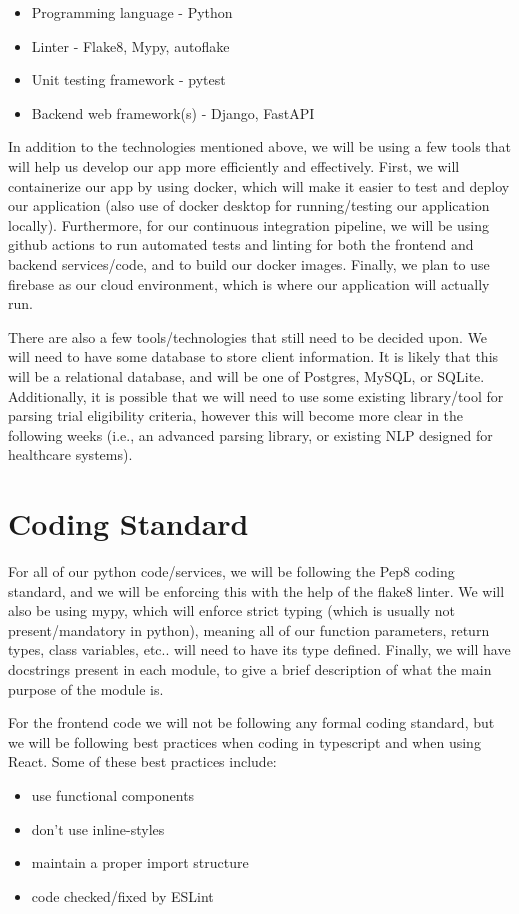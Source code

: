 \documentclass{article}
\begin{document}
\begin{itemize}
	\item Programming language - Python
	\item Linter - Flake8, Mypy, autoflake
	\item Unit testing framework - pytest
	\item Backend web framework(s) - Django, FastAPI
\end{itemize}

In addition to the technologies mentioned above, we will be using a few tools that will help us 
develop our app more efficiently and effectively. First, we will containerize our app
by using docker, which will make it easier to test and deploy our application (also use of docker desktop for running/testing
our application locally). Furthermore, for our continuous 
integration pipeline, we will be using github actions to run automated tests and linting for both the frontend and backend 
services/code, and to build our docker images. Finally, we plan to use firebase as our cloud environment, which
is where our application will actually run.

There are also a few tools/technologies that still need to be decided upon. We will need to have some database to store
client information. It is likely that this will be a relational database, and will be one of Postgres, MySQL, or SQLite.
Additionally, it is possible that we will need to use some existing library/tool for parsing trial eligibility criteria, however this 
will become more clear in the following weeks (i.e., an advanced parsing library, or existing NLP designed for healthcare systems).

\section{Coding Standard}

For all of our python code/services, we will be following the Pep8 coding standard, and we will be enforcing this 
with the help of the flake8 linter. We will also be using mypy, which will enforce strict typing (which is usually not present/mandatory
in python), meaning all of our function parameters, return types, class variables, etc.. will need to have its type defined. Finally, we will
have docstrings present in each module, to give a brief description of what the main purpose of the module is.

For the frontend code we will not be following any formal coding standard, but we will be following best practices
when coding in typescript and when using React. Some of these best practices include:
\begin{itemize}
	\item use functional components
	\item don't use inline-styles
	\item maintain a proper import structure
	\item code checked/fixed by ESLint
\end{itemize}
\end{document}
